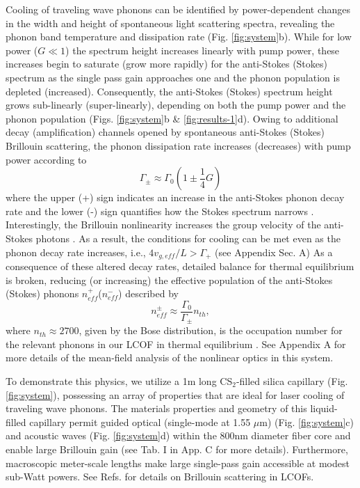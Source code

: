 Cooling of traveling wave phonons can be identified by power-dependent changes in the width and height of spontaneous light scattering spectra, revealing the phonon band temperature and dissipation rate (Fig. \ref{fig:system}b). While for low power ($G \ll 1$) the spectrum height increases linearly with pump power, these increases begin to saturate (grow more rapidly) for the anti-Stokes (Stokes) spectrum as the single pass gain approaches one and the phonon population is depleted (increased). Consequently, the anti-Stokes (Stokes) spectrum height grows sub-linearly (super-linearly), depending on both the pump power and the phonon population (Figs. \ref{fig:system}b \& \ref{fig:results-1}d). Owing to additional decay (amplification) channels opened by spontaneous anti-Stokes (Stokes) Brillouin scattering, the phonon dissipation rate increases (decreases) with pump power according to
\begin{equation}
\label{eq:gamma}
   \Gamma_{\pm} \approx \Gamma_0\left(1\pm \frac{1}{4}G\right)
\end{equation}
where the upper (+) sign indicates an increase in the anti-Stokes phonon decay rate and the lower (-) sign quantifies how the Stokes spectrum narrows \citep{otterstrom2018optomechanical}.
%
Interestingly, the Brillouin nonlinearity increases the group velocity of the anti-Stokes photons  \citep{gonzalez2005optically}. As a result, the conditions for cooling can be met even as the phonon decay rate increases, i.e., $4 v_{g,eff}/L > \Gamma_+$ (see Appendix Sec. A)
%
As a consequence of these altered decay rates, detailed balance for thermal equilibrium is broken, reducing (or increasing) the effective population of the anti-Stokes (Stokes) phonons $n^+_{eff}$($n^-_{eff}$) described by
\begin{equation}
\label{eq:neff}
    n^{\pm}_{eff} \approx \frac{\Gamma_0}{\Gamma_{\pm}} n_{th},
\end{equation}
where $n_{th} \approx 2700$, given by the Bose distribution, is the occupation number for the relevant phonons in our \acf{LCOF} in thermal equilibrium \citep{otterstrom2018optomechanical}. See Appendix A for more details of the mean-field analysis of the nonlinear optics in this system.

To demonstrate this physics, we utilize a 1m long CS$_2$-filled silica capillary (Fig. \ref{fig:system}), possessing an array of properties that are ideal for laser cooling of traveling wave phonons. The materials properties and geometry of this liquid-filled capillary permit guided optical (single-mode at 1.55 $\mu$m) (Fig. \ref{fig:system}c) and acoustic waves (Fig. \ref{fig:system}d) within the $800$nm diameter fiber core and enable large Brillouin gain (see Tab. I in App. C for more details). Furthermore, macroscopic meter-scale lengths make large single-pass gain accessible at modest sub-Watt powers. See Refs. \citep{kieu2013brillouin,kieu2014nonlinear,behunin2019spontaneous} for details on Brillouin scattering in \ac{LCOF}s.

